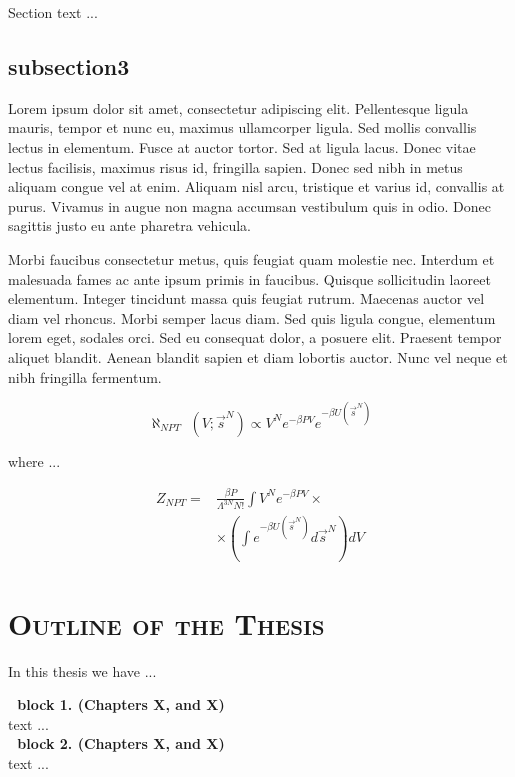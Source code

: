 \begin{multicols}{2}
Section text ...

\subsection{subsection3}

 Lorem ipsum dolor sit amet, consectetur adipiscing elit. Pellentesque ligula mauris, tempor et nunc eu, maximus ullamcorper ligula. Sed mollis convallis lectus in elementum. Fusce at auctor tortor. Sed at ligula lacus. Donec vitae lectus facilisis, maximus risus id, fringilla sapien. Donec sed nibh in metus aliquam congue vel at enim. Aliquam nisl arcu, tristique et varius id, convallis at purus. Vivamus in augue non magna accumsan vestibulum quis in odio. Donec sagittis justo eu ante pharetra vehicula.

Morbi faucibus consectetur metus, quis feugiat quam molestie nec. Interdum et malesuada fames ac ante ipsum primis in faucibus. Quisque sollicitudin laoreet elementum. Integer tincidunt massa quis feugiat rutrum. Maecenas auctor vel diam vel rhoncus. Morbi semper lacus diam. Sed quis ligula congue, elementum lorem eget, sodales orci. Sed eu consequat dolor, a posuere elit. Praesent tempor aliquet blandit. Aenean blandit sapien et diam lobortis auctor. Nunc vel neque et nibh fringilla fermentum. 


\begin{equation} 
\aleph_{NPT}\,\, (V;\vec{s}^N) \propto V^N e^{-\beta PV} e^{-\beta 
U(\vec{s}^N)} 
\end{equation}


\noindent where ...

\begin{equation}
\begin{aligned}
 Z_{NPT}= & \frac{\beta P}{\Lambda^{3N}N!} \int V^N e^{-\beta PV} \times \\ 
& \times \left(\int e^{-\beta U(\vec{s}^N)}d\vec{s}^N\right)dV
 \end{aligned}
\end{equation}



\section{\textsc{Outline of the Thesis}}
\label{sec:sec04}

In this thesis we have ...


 \noindent \textbullet\,\, \textbf{block 1. (Chapters X, and X)}\\ 


\noindent text ...\\

 \noindent \textbullet\,\, \textbf{block 2. (Chapters X, and X)}\\ 


\noindent text ...



\begingroup
    \setlength\bibindent{-20pt}
    \setlength{\bibsep}{0pt}
\scriptsize{

}
\endgroup



\end{multicols}
